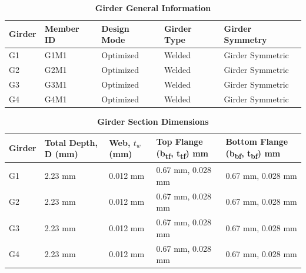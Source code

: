\documentclass[12pt,a4paper]{report}
\numberwithin{table}{chapter}
\numberwithin{figure}{chapter}
\begin{document}
\newpage

\vspace{0.4em}
\noindent
            
\vspace{4pt}
\begin{longtable}{|L{2.2cm}|L{1.8cm}|p{3.8cm}|p{3.8cm}|p{3.8cm}|}
\caption{\textbf{Girder General Information}}
\hline
\textbf{Girder} & \textbf{Member ID} & \textbf{Design Mode} & \textbf{Girder Type} & \textbf{Girder Symmetry} \\[6pt]
\hline
G1 & G1M1 & Optimized & Welded & Girder Symmetric \\[8pt]
\hline
G2 & G2M1 & Optimized & Welded & Girder Symmetric \\[8pt]
\hline
G3 & G3M1 & Optimized & Welded & Girder Symmetric \\[8pt]
\hline
G4 & G4M1 & Optimized & Welded & Girder Symmetric \\[8pt]
\hline
\end{longtable}

\vspace{0.6em}

\vspace{4pt}
\begin{longtable}{|L{1.8cm}|L{2.3cm}|L{1.8cm}|p{4.8cm}|p{4.8cm}|}
\caption{\textbf{Girder Section Dimensions}}
\hline
\textbf{Girder} & \textbf{Total Depth, D (mm)} & \textbf{Web, $t_w$ (mm)} & \textbf{Top Flange (b\textsubscript{tf}, t\textsubscript{tf}) mm} & \textbf{Bottom Flange (b\textsubscript{bf}, t\textsubscript{bf}) mm} \\[6pt]
\hline
G1 & 2.23 mm & 0.012 mm & 0.67 mm, 0.028 mm & 0.67 mm, 0.028 mm \\[8pt]
\hline
G2 & 2.23 mm & 0.012 mm & 0.67 mm, 0.028 mm & 0.67 mm, 0.028 mm \\[8pt]
\hline
G3 & 2.23 mm & 0.012 mm & 0.67 mm, 0.028 mm & 0.67 mm, 0.028 mm \\[8pt]
\hline
G4 & 2.23 mm & 0.012 mm & 0.67 mm, 0.028 mm & 0.67 mm, 0.028 mm \\[8pt]
\hline
\end{longtable}

\vspace{0.6em}
\end{document}
